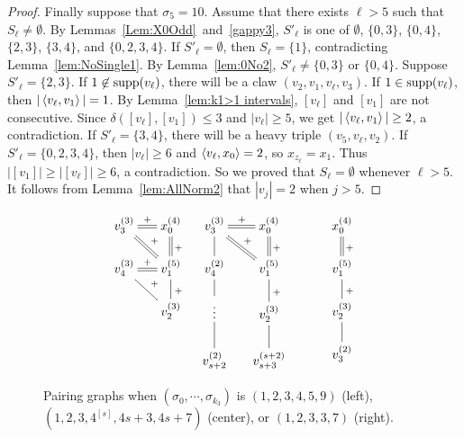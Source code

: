 \begin{proof}
Finally suppose that $\sigma_5=10$. Assume that there exists $\ell>5$ such that %
$S_{\ell}\ne\emptyset$. By Lemmas~\ref{Lem:X0Odd}~and~\ref{gappy3}, $S'_\ell$ is one of $\emptyset$, $\{0,3\}$, $\{0,4\}$, $\{2, 3\}$, $\{ 3, 4\}$, and $\{0,2,3,4\}$. 
If $S'_\ell=\emptyset$, then $S_{\ell}=\{1\}$, contradicting Lemma~\ref{lem:NoSingle1}. By Lemma~\ref{lem:0No2}, $S'_\ell\ne\{0,3\}$ or $\{0,4\}$. Suppose $S'_\ell = \{2,3\}$. If $1\not \in \operatorname{supp}(v_\ell)$, there will be a claw $(v_2, v_1, v_\ell, v_3)$. If $1\in \operatorname{supp}(v_\ell)$, then $|\left\langle v_\ell , v_1 \right\rangle|=1$. By Lemma~\ref{lem:k1>1 intervals}, $[v_{\ell}]$ and $[v_1]$ are not consecutive. Since $\delta([v_\ell], [v_1])\le 3$ and $|v_\ell|\ge 5$, we get $|\left\langle v_\ell , v_1 \right\rangle|\ge2$, a contradiction. 
If $S'_\ell=\{3,4\}$, there will be a heavy triple $(v_5,v_\ell, v_2)$. If $S'_\ell=\{0,2,3,4\}$, then $|v_\ell|\ge 6$ and $\left\langle v_{\ell} , x_0 \right\rangle=2$, so $x_{z_{\ell}}=x_1$. Thus $|[v_1]|\ge |[v_\ell]|\ge6$, a contradiction. So we proved that $S_\ell=\emptyset$ whenever $\ell>5$. It follows from Lemma~\ref{lem:AllNorm2} that $|v_j|=2$ when $j>5$.
\end{proof}

\begin{figure}
	\begin{align*}
	\xymatrix@R1.5em@C1.5em{
		v_{3}^{(3)}\ar@{=}[r]^{+}\ar@{=}[dr]^{+} & x_0^{(4)} \ar@{=}[d]^{+} \\
		v_4^{(3)} \ar@{=}[r]^{+} \ar@{-}[dr]^{+} & v_1^{(5)} \ar@{-}[d]^{+} \\
		& v_{2}^{(3)} \\
	}
	&&
	\xymatrix@R1.5em@C1.5em{
		v_3^{(3)} \ar@{-}[d] \ar@{=}[r]^{+} \ar@{=}[dr]^{+} & x_0^{(4)} \ar@{=}[d]^{+} \\
		v_{4}^{(2)}\ar@{-}[d] & v_1^{(5)} \ar@{-}[d]^{+} \\
		\vdots & v_{2}^{(3)} \ar@{-}[d] \\
		v_{s+2}^{(2)}\ar@{-}[u] & v_{s+3}^{(s+2)}  
	}
	&&
	\xymatrix@R1.5em@C1.5em{
		& x_0^{(4)} \ar@{=}[d]^{+} \\
                     & v_1^{(5)} \ar@{-}[d]^{+} \\
		 & v_{2}^{(3)} \ar@{-}[d] \\
		& v_{3}^{(2)} \\
	}
	\end{align*}
	\caption{Pairing graphs when $(\sigma_0, \cdots, \sigma_{k_3})$ is $(1,2,3,4,5,9)$ (left), $(1,2,3,4^{[s]}, 4s+3, 4s+7)$ (center), or $(1,2,3,3,7)$ (right).}
	\label{fig:case1 123 G(S)}
\end{figure}

